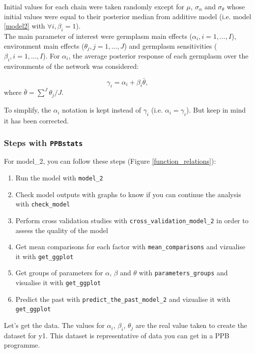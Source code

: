 \documentclass{book}\usepackage[]{graphicx}\usepackage[]{color}
\newcommand{\pack}{\texttt{PPBstats}}
\begin{document}
Initial values for each chain were taken randomly except for $\mu$, $\sigma_{\alpha}$ and $\sigma_{\theta}$ whose initial values were equal to their posterior median from additive model (i.e. model \ref{model2} with $\forall i, \beta_{i}=1$). \\


The main parameter of interest were 
germplasm main effects ($\alpha_{i}, i = 1,\ldots, I$), 
environment main effects ($\theta_{j}, j = 1,\ldots, J$) and 
germplasm sensitivities ($\beta_{i}, i = 1,\ldots, I$).
For $\alpha_i$, the average posterior response of each germplasm over the environments of the network was considered:

\begin{displaymath}
\gamma_i = \alpha_i + \beta_{i} \bar{\theta},
\end{displaymath}
where
$\bar{\theta} = \sum_{}^{J} \theta_j/J$.

To simplify, the $\alpha_i$ notation is kept instead of $\gamma_i$ (i.e. $\alpha_i = \gamma_i$).
But keep in mind it has been corrected.

\subsubsection{Steps with \pack}

For model\_2, you can follow these steps (Figure \ref{function_relations}):

\begin{enumerate}
\item Run the model with \texttt{model\_2}
\item Check model outputs with graphs to know if you can continue the analysis with \texttt{check\_model}
\item Perform cross validation studies with \texttt{cross\_validation\_model\_2} in order to assess the quality of the model
\item Get mean comparisons for each factor with \texttt{mean\_comparisons} and vizualise it with \texttt{get\_ggplot}
\item Get groups of parameters for $\alpha$, $\beta$ and $\theta$ with \texttt{parameters\_groups} and visualise it with \texttt{get\_ggplot}
\item Predict the past with \texttt{predict\_the\_past\_model\_2} and vizualise it with \texttt{get\_ggplot}
\end{enumerate}

Let's get the data.
The values for $\alpha_i$, $\beta_i$, $\theta_j$ are the real value taken to create the dataset for y1.
This dataset is representative of data you can get in a PPB programme.
\end{document}
